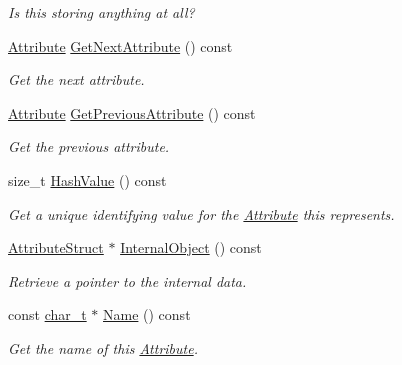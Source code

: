 \begin{DoxyCompactItemize}
\begin{DoxyCompactList}\small\item\em Is this storing anything at all? \item\end{DoxyCompactList}\item 
\hyperlink{classMezzanine_1_1xml_1_1Attribute}{Attribute} \hyperlink{classMezzanine_1_1xml_1_1Attribute_a0e536a406969ff3ab7c859c197fe374e}{GetNextAttribute} () const 
\begin{DoxyCompactList}\small\item\em Get the next attribute. \item\end{DoxyCompactList}\item 
\hyperlink{classMezzanine_1_1xml_1_1Attribute}{Attribute} \hyperlink{classMezzanine_1_1xml_1_1Attribute_a52aeec126d501ee0e6ded15c8b5fc811}{GetPreviousAttribute} () const 
\begin{DoxyCompactList}\small\item\em Get the previous attribute. \item\end{DoxyCompactList}\item 
size\_\-t \hyperlink{classMezzanine_1_1xml_1_1Attribute_ab7ddcd52f27d54683e4c6f29d4c54169}{HashValue} () const 
\begin{DoxyCompactList}\small\item\em Get a unique identifying value for the \hyperlink{classMezzanine_1_1xml_1_1Attribute}{Attribute} this represents. \item\end{DoxyCompactList}\item 
\hyperlink{classAttributeStruct}{AttributeStruct} $\ast$ \hyperlink{classMezzanine_1_1xml_1_1Attribute_a85eaa919b1982ce5c65eaeb7393f4368}{InternalObject} () const 
\begin{DoxyCompactList}\small\item\em Retrieve a pointer to the internal data. \item\end{DoxyCompactList}\item 
const \hyperlink{namespaceMezzanine_1_1xml_a29b8a47c179e9895c4e9e66c45d1dbbc}{char\_\-t} $\ast$ \hyperlink{classMezzanine_1_1xml_1_1Attribute_a5903b1a7c6d9e3fa620ad960118ec132}{Name} () const 
\begin{DoxyCompactList}\small\item\em Get the name of this \hyperlink{classMezzanine_1_1xml_1_1Attribute}{Attribute}. \item\end{DoxyCompactList}\item 

\end{DoxyCompactItemize}
